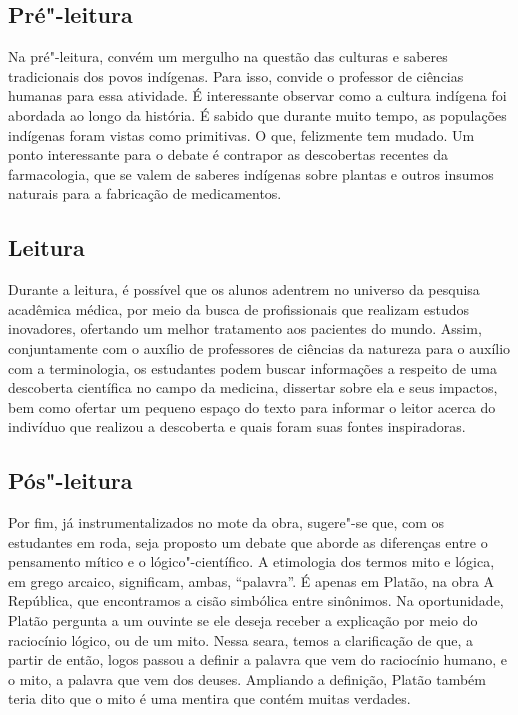\documentclass[12pt]{extarticle}
\begin{document}

\subsection{Pré"-leitura}

Na pré"-leitura, convém um mergulho na questão das culturas e
saberes tradicionais dos povos indígenas. Para isso, convide o professor
de ciências humanas para essa atividade. É interessante observar como a
cultura indígena foi abordada ao longo da história. É sabido que durante
muito tempo, as populações indígenas foram vistas como primitivas. O
que, felizmente tem mudado. Um ponto interessante para o debate é
contrapor as descobertas recentes da farmacologia, que se valem de
saberes indígenas sobre plantas e outros insumos naturais para a
fabricação de medicamentos.

\subsection{Leitura}

Durante a leitura, é possível que os alunos adentrem no
universo da pesquisa acadêmica médica, por meio da busca de
profissionais que realizam estudos inovadores, ofertando um melhor
tratamento aos pacientes do mundo. Assim, conjuntamente com o auxílio de
professores de ciências da natureza para o auxílio com a terminologia,
os estudantes podem buscar informações a respeito de uma descoberta
científica no campo da medicina, dissertar sobre ela e seus impactos,
bem como ofertar um pequeno espaço do texto para informar o leitor
acerca do indivíduo que realizou a descoberta e quais foram suas fontes
inspiradoras.

\subsection{Pós"-leitura}

Por fim, já instrumentalizados no mote da obra, sugere"-se
que, com os estudantes em roda, seja proposto um debate que aborde as
diferenças entre o pensamento mítico e o lógico"-científico. A etimologia
dos termos mito e lógica, em grego arcaico, significam, ambas,
``palavra''. É apenas em Platão, na obra A República, que encontramos a
cisão simbólica entre sinônimos. Na oportunidade, Platão pergunta a um
ouvinte se ele deseja receber a explicação por meio do raciocínio
lógico, ou de um mito. Nessa seara, temos a clarificação de que, a
partir de então, logos passou a definir a palavra que vem do raciocínio
humano, e o mito, a palavra que vem dos deuses. Ampliando a definição,
Platão também teria dito que o mito é uma mentira que contém muitas
verdades.
\end{document}
